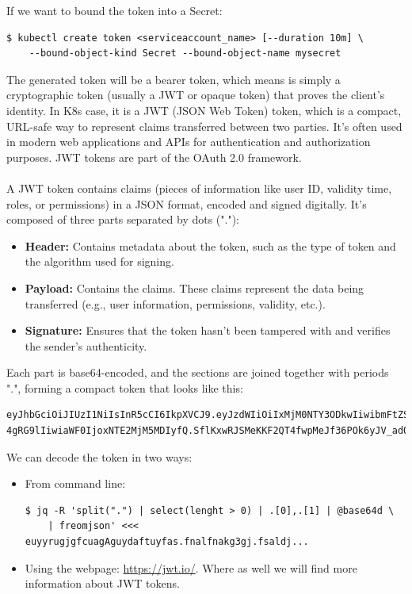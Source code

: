 \documentclass{article}
\newenvironment{codetemplate}[1][]{%
  \mybasecolorbox[#1]
  \itshape
}{%
  \endmybasecolorbox
}
\begin{document}
If we want to bound the token into a Secret:
\begin{codetemplate}{}
\begin{verbatim}
$ kubectl create token <serviceaccount_name> [--duration 10m] \
    --bound-object-kind Secret --bound-object-name mysecret
\end{verbatim}
\end{codetemplate}

The generated token will be a bearer token, which means is simply a cryptographic token (usually a JWT or opaque token) that proves the client's identity.
In K8s case, it is a JWT (JSON Web Token) token, which is a compact, URL-safe way to represent claims transferred between two parties. It's often used in modern web applications and APIs for authentication and authorization purposes. JWT tokens are part of the OAuth 2.0 framework.
\\\\
A JWT token contains claims (pieces of information like user ID, validity time, roles, or permissions) in a JSON format, encoded and signed digitally. It's composed of three parts separated by dots ("."):
\begin{itemize}
    \item \textbf{Header:} Contains metadata about the token, such as the type of token and the algorithm used for signing.
    \item \textbf{Payload:} Contains the claims. These claims represent the data being transferred (e.g., user information, permissions, validity, etc.).
    \item \textbf{Signature:} Ensures that the token hasn't been tampered with and verifies the sender's authenticity.
\end{itemize}
Each part is base64-encoded, and the sections are joined together with periods ".", forming a compact token that looks like this:
\begin{codetemplate}{}
\begin{verbatim}
eyJhbGciOiJIUzI1NiIsInR5cCI6IkpXVCJ9.eyJzdWIiOiIxMjM0NTY3ODkwIiwibmFtZSI6IkpvaG
4gRG9lIiwiaWF0IjoxNTE2MjM5MDIyfQ.SflKxwRJSMeKKF2QT4fwpMeJf36POk6yJV_adQssw5c
\end{verbatim}
\end{codetemplate}

We can decode the token in two ways:
\begin{itemize}
    \item From command line:
\begin{codetemplate}{}
\begin{verbatim}
$ jq -R 'split(".") | select(lenght > 0) | .[0],.[1] | @base64d \
    | freomjson' <<< euyyrugjgfcuagAguydaftuyfas.fnalfnakg3gj.fsaldj...
\end{verbatim}
\end{codetemplate}
    \item Using the webpage: \href{https://jwt.io/}{https://jwt.io/}. Where as well we will find more information about JWT tokens.
\end{itemize}
\end{document}
